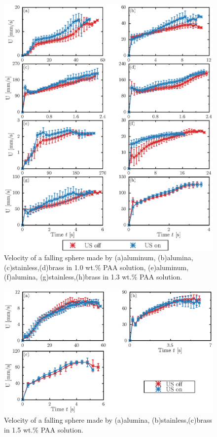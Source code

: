 \begin{figure}[h]
    \centering
    \includegraphics[width=1.0\textwidth]{5-Results/1.0-1.3.eps}
    \caption{Velocity of a falling sphere made by (a)aluminum, (b)alumina, (c)stainless,(d)brass in 1.0 wt.\% PAA solution, (e)aluminum, (f)alumina, (g)stainless,(h)brass in 1.3 wt.\% PAA solution.}
    \label{fig:1.0-1.3}
\end{figure}

\begin{figure}[h]
    \centering
    \includegraphics[width=1.0\textwidth]{5-Results/1.5.eps}
    \caption{Velocity of a falling sphere made by (a)alumina, (b)stainless,(c)brass in 1.5 wt.\% PAA solution.}
    \label{fig:1.5}
\end{figure}

